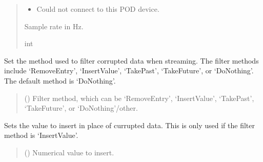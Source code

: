 \documentclass[letterpaper,10pt,english]{sphinxmanual}
\begin{document}
\begin{fulllineitems}
\begin{fulllineitems}
\begin{quote}
\begin{description}
\begin{itemize}
\item {} 
\sphinxAtStartPar
{} \textendash{} Could not connect to this POD device.

\end{itemize}

\sphinxAtStartPar
Sample rate in Hz.

\sphinxAtStartPar
int

\end{description}\end{quote}

\end{fulllineitems}


\begin{fulllineitems}
\label{\detokenize{PodApi.Stream:PodApi.Stream.DataHose.Hose.PickFilterMethod}}
\pysigstartsignatures
{}
\pysigstopsignatures
\sphinxAtStartPar
Set the method used to filter corrupted data when streaming. The filter methods         include ‘RemoveEntry’, ‘InsertValue’, ‘TakePast’, ‘TakeFuture’, or ‘DoNothing’.          The default method is ‘DoNothing’.
\begin{quote}\begin{description}
\sphinxAtStartPar
{} () \textendash{} Filter method, which can be ‘RemoveEntry’,
‘InsertValue’, ‘TakePast’, ‘TakeFuture’, or ‘DoNothing’/other.

\end{description}\end{quote}

\end{fulllineitems}


\begin{fulllineitems}
\label{\detokenize{PodApi.Stream:PodApi.Stream.DataHose.Hose.SetFilterInsertValue}}
\pysigstartsignatures
{}
\pysigstopsignatures
\sphinxAtStartPar
Sets the value to insert in place of currupted data. This is only used if the filter method is ‘InsertValue’.
\begin{quote}\begin{description}
\sphinxAtStartPar
{} () \textendash{} Numerical value to insert.


\end{description}
\end{quote}
\end{fulllineitems}
\end{fulllineitems}
\end{document}
